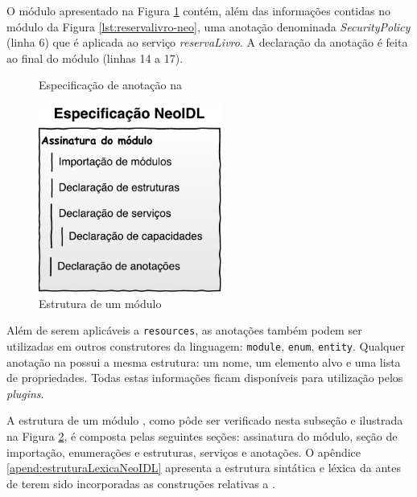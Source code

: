 O módulo apresentado na Figura \ref{lst:annotationNeoIDL} contém, além das
informações contidas no módulo da Figura \ref{lst:reservalivro-neo}, uma anotação
denominada \emph{SecurityPolicy} (linha 6) que é aplicada ao serviço
\emph{reservaLivro}.
A declaração da anotação é feita ao final do módulo (linhas 14 a 17).

\vspace{6mm}
 
\begin{figure}[htb]
\begin{small}
%

\vspace{-.5cm}
\end{small}
\caption{Especificação de anotação na \neoidl{}}
\label{lst:annotationNeoIDL}
\end{figure}

\begin{figure}[htb]
\begin{center}
\includegraphics[width=60mm,trim=0cm 0cm 0cm
0cm]{img/NeoIDLModuleSpecificationPt.pdf}
\end{center}
\caption{Estrutura de um módulo \neoidl{}}
\label{fig:moduloNeoIDL}
\end{figure}

Além de serem aplicáveis a \texttt{resources}, as anotações também podem ser
utilizadas em outros construtores da linguagem: \texttt{module},
\texttt{enum}, \texttt{entity}. Qualquer anotação na \neoidl{} possui a mesma estrutura: um
nome, um elemento alvo e uma lista de propriedades. Todas estas informações
ficam disponíveis para utilização pelos \textit{plugins}.


A estrutura de um módulo \neoidl{}, como pôde ser verificado nesta subseção e
ilustrada na Figura \ref{fig:moduloNeoIDL}, é composta pelas seguintes seções: assinatura do módulo, seção de importação, enumerações e estruturas,
serviços e anotações. O apêndice \ref{apend:estruturaLexicaNeoIDL} apresenta a
estrutura sintática e léxica da \neoidl{} antes de terem sido incorporadas as construções
relativas a \designbycontract{}.



